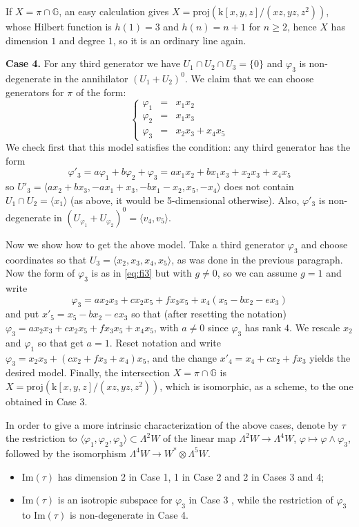 \documentclass[10pt,reqno]{amsart}
\newcommand{\la}{\langle}
\newcommand{\ra}{\rangle}
\newcommand{\GG}{\mathbb{G}}
\newcommand{\f}{\varphi}
\newcommand{\kk}{\mathrm{k}}
\newcommand{\tr}[1]{\textrm{#1}}
\theoremstyle{definition}
\begin{document}
\noindent If $X=\pi \cap \GG$, an easy calculation gives $X=\mathrm{proj}(\kk[x,y,z]/(xz, yz, z^2))$, whose Hilbert function is $h(1)=3$ and $h(n)=n+1$ for $n \ge 2$, hence $X$ has dimension $1$ and degree $1$, so it is an ordinary line again.

\noindent\textbf{Case 4.} For any third generator we have $U_1 \cap U_2 \cap U_3=\{0\}$ and $\f_3$ is non-degenerate in the annihilator $(U_1+U_2)^0$. We claim that we can choose generators for $\pi$ of the form:
\[ 
\left\{\begin{array}{ccl}
 \f_1 & = & x_1x_2\\
 \f_2 & = & x_1x_3\\
 \f_3 & = & x_2x_3+x_4x_5
\end{array}\right.
\]
We check first that this model satisfies the condition: any third generator has the form 
\[
\f'_3=a \f_1+b\f_2+\f_3=ax_1x_2+bx_1x_3+x_2x_3+x_4x_5
\]
so $U'_3=\langle ax_2+bx_3,-ax_1+x_3,-bx_1-x_2,x_5,-x_4 \rangle$ does not contain $U_1 \cap U_2=\langle x_1 \rangle$ (as above, it would be 5-dimensional otherwise). Also, $\f'_3$ is non-degenerate in $(U_{\f_1}+U_{\f_2})^0=\langle v_4,v_5\rangle$.

\noindent Now we show how to get the above model. Take a third generator $\f_3$ and choose coordinates so that $U_3=\la x_2,x_3, x_4, x_5\ra$, as was done in the previous paragraph. Now the form of $\f_3$ is as in \eqref{eq:fi3} but with $g \ne 0$, so we can assume $g=1$ and write
\[
\f_3=ax_2x_3+cx_2x_5+fx_3x_5+x_4(x_5-bx_2-ex_3)
\]
and put $x'_5=x_5-bx_2-ex_3$ so that (after resetting the notation) $\f_3=ax_2x_3+cx_2x_5+fx_3x_5+x_4x_5$, with $a\ne 0$ since $\f_3$ has rank $4$. We rescale $x_2$ and $\f_1$ so that get $a=1$. Reset notation and write $\f_3=x_2x_3+(cx_2+fx_3+x_4)x_5$, and the change $x'_4=x_4+cx_2+fx_3$ yields the desired model. Finally, the intersection $X=\pi \cap \GG$ is $X=\mathrm{proj}(\kk[x,y,z]/(xz, yz, z^2))$, which is isomorphic, as a scheme, to the one obtained in Case 3.

\noindent In order to give a more intrinsic characterization of the above cases, denote by $\tau$ the restriction to $\la\f_1,\f_2,\f_3\ra\subset\Lambda^2 W$ of the linear map $\Lambda^2 W\to\Lambda^4 W$, $\f\mapsto\f\wedge\f_3$, followed by the isomorphism $\Lambda^4 W\to W^*\otimes\Lambda^5 W$.
\begin{itemize}
    \item $\tr{Im}(\tau)$ has dimension 2 in Case 1, 1 in Case 2 and 2 in Cases 3 and 4;
    \item $\tr{Im}(\tau)$ is an isotropic subspace for $\f_3$ in Case 3 , while the restriction of $\f_3$ to $\tr{Im}(\tau)$ is non-degenerate in Case 4. 
\end{itemize}
\end{document}
